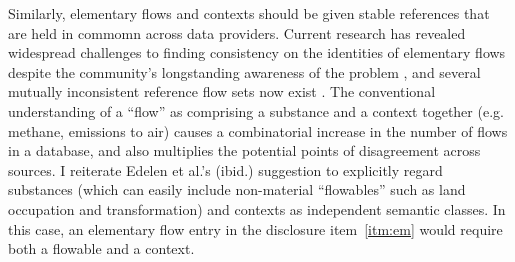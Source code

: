Similarly, %
elementary flows and contexts should be given stable references that are held in commomn across data providers. Current research has revealed widespread challenges to finding consistency on the identities of elementary flows despite the community's longstanding awareness of the problem \citep{Speck_2015,Herrmann_2015}, and several mutually inconsistent reference flow sets now exist \citep{Edelen_2017}.  The conventional understanding of a ``flow'' as comprising a substance and a context together (e.g. methane, emissions to air) causes a combinatorial increase in the number of flows in a database, and also multiplies the potential points of disagreement across sources.  I reiterate Edelen et al.'s (ibid.) suggestion to explicitly regard substances (which can easily include non-material ``flowables'' such as land occupation and transformation) and contexts as independent semantic classes.  In this case, an elementary flow entry in the disclosure item~\ref{itm:em} would require both a flowable and a context.

\endinput

It is necessary for the entries in disclosure items~\ref{itm:bg} and \ref{itm:em} to be unambiguous and easy to interpret.  Entries in \ref{itm:bg}, which represent rows in $A_d$, must clearly identify the originating database, version, and configuration, along with the precise dataset, that dataset's reference flow, and the dimension (reference quantity or unit) of that flow.  In addition, the sign of the numeric entry in $A_d$ must be consistent with the implementation of the background dataset.  Similar requirements also hold for entries in \ref{itm:em}, which represent rows in $B_f$.

